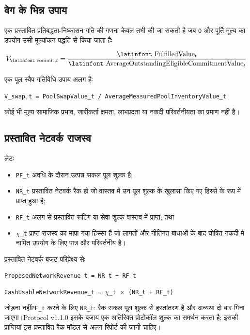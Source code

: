 \documentclass[11pt]{article}
\begin{document}
\subsection*{वेग के भिन्न उपाय}

एक प्रस्तावित प्रतिबद्धता-निष्कासन गति की गणना केवल तभी की जा सकती है जब \texttt{O} और पूर्ति मूल्य का उपयोग उसी मूल्यांकन पद्धति से किया जाता हैः

\[
V_{\text{\latinfont commit},t} = \frac{\text{\latinfont FulfilledValue}_t}{\text{\latinfont AverageOutstandingEligibleCommitmentValue}_t}
\]

एक पूल स्वैप गतिविधि उपाय अलग हैः

\texttt{V\_swap,t = PoolSwapValue\_t / AverageMeasuredPoolInventoryValue\_t}

कोई भी मूल्य सामाजिक प्रभाव, जारीकर्ता क्षमता, लाभप्रदता या नकदी परिवर्तनीयता का प्रमाण नहीं है।

\subsection*{प्रस्तावित नेटवर्क राजस्व}

लेटः

\begin{itemize}[leftmargin=*]
\item \texttt{PF\_t} अवधि के दौरान उत्पन्न सकल पूल शुल्क है;
\item \texttt{NR\_t} प्रस्तावित नेटवर्क रैक हो जो वास्तव में उन पूल शुल्क के खुलासा किए गए हिस्से के रूप में प्राप्त हुआ है;
\item \texttt{RF\_t} अलग से प्रस्तावित रूटिंग या सेवा शुल्क वास्तव में प्राप्त; तथा
\item \texttt{$\chi$\_t} प्राप्त राजस्व का मापा गया हिस्सा है जो लागतों और नीतिगत बाधाओं के बाद घोषित नकदी में नामित उपयोग के लिए पात्र और परिवर्तनीय है।
\end{itemize}
प्रस्तावित नेटवर्क बजट परिप्रेक्ष्य सेः

\texttt{ProposedNetworkRevenue\_t = NR\_t + RF\_t}

\texttt{CashUsableNetworkRevenue\_t = $\chi$\_t $\times$ (NR\_t + RF\_t)}

जोड़ना नहीं\texttt{PF\_t} करने के लिए \texttt{NR\_t}: रैक सकल पूल शुल्क से हस्तांतरण है और अन्यथा दो बार गिना जाएगा।Protocol v1.1.0 इसके बजाय एक अतिरिक्त प्रोटोकॉल शुल्क का समर्थन करता है; इसकी प्राप्तियां इस प्रस्तावित रैक मॉडल से अलग रिपोर्ट की जानी चाहिए।
\end{document}
